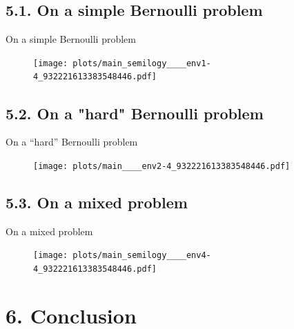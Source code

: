 \documentclass[12pt,english,ignorenonframetext,]{beamer}
\begin{document}
\subsection{\hfill{}5.1. On a simple Bernoulli problem\hfill{}}

\begin{frame}{%
\protect\hypertarget{on-a-simple-bernoulli-problem}{%
On a simple Bernoulli problem}}

\begin{figure}
\centering
\texttt{[image: plots/main\_semilogy\_\_\_\_env1-4\_932221613383548446.pdf]}
\end{figure}

\end{frame}



\subsection{\hfill{}5.2. On a "hard" Bernoulli problem\hfill{}}

\begin{frame}{%
\protect\hypertarget{on-a-hard-bernoulli-problem}{%
On a ``hard'' Bernoulli problem}}

\begin{figure}
\centering
\texttt{[image: plots/main\_\_\_\_env2-4\_932221613383548446.pdf]}
\end{figure}

\end{frame}



\subsection{\hfill{}5.3. On a mixed problem\hfill{}}

\begin{frame}{%
\protect\hypertarget{on-a-mixed-problem}{%
On a mixed problem}}

\begin{figure}
\centering
\texttt{[image: plots/main\_semilogy\_\_\_\_env4-4\_932221613383548446.pdf]}
\end{figure}

\end{frame}



\section{\hfill{}6. Conclusion\hfill{}}
\end{document}
